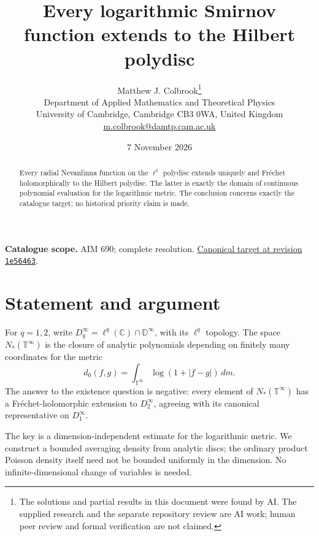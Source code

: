 \documentclass[11pt,a4paper]{article}
\theoremstyle{remark}
\begin{document}
\title{Every logarithmic Smirnov function extends to the Hilbert polydisc}
\author{Matthew J. Colbrook\thanks{The solutions and partial results in this document were found by AI. The supplied research and the separate repository review are AI work; human peer review and formal verification are not claimed.}\\[4pt]
\small Department of Applied Mathematics and Theoretical Physics\\
\small University of Cambridge, Cambridge CB3 0WA, United Kingdom\\
\small\href{mailto:m.colbrook@damtp.cam.ac.uk}{m.colbrook@damtp.cam.ac.uk}}
\date{7 November 2026}
\maketitle
\begin{abstract}
Every radial Nevanlinna function on the $\ell^1$ polydisc extends uniquely and Fr\'echet holomorphically to the Hilbert polydisc. The latter is exactly the domain of continuous polynomial evaluation for the logarithmic metric. The conclusion concerns exactly the catalogue target; no historical priority claim is made.
\end{abstract}
\noindent\textbf{Catalogue scope.} AIM 690; complete resolution. \href{https://github.com/MColbrook/AIM/blob/1e564633494c109edfd3ec46da1366adcff925a5/problems/690-a-smirnov-function-without-a-hilbert-domain-holomorphic-extension.md}{Canonical target at revision \texttt{1e56463}}.


\section{Statement and argument}
\label{sec:690}

For $q=1,2$, write
$D_q^\infty=\ell^q(\mathbb C)\cap\mathbb D^\infty$, with its
$\ell^q$ topology.  The space $N_*(\mathbb T^\infty)$ is the closure
of analytic polynomials depending on finitely many coordinates for
the metric
\[
 d_0(f,g)=\int_{\mathbb T^\infty}\log(1+|f-g|)\,dm.
\]
The answer to the existence question is negative: every element of
$N_*(\mathbb T^\infty)$ has a Fr\'echet-holomorphic extension to
$D_2^\infty$, agreeing with its canonical representative on
$D_1^\infty$.

The key is a dimension-independent estimate for the logarithmic metric.
We construct a bounded averaging density from analytic discs; the
ordinary product Poisson density itself need not be bounded uniformly
in the dimension.  No infinite-dimensional change of variables is
needed.
\end{document}
